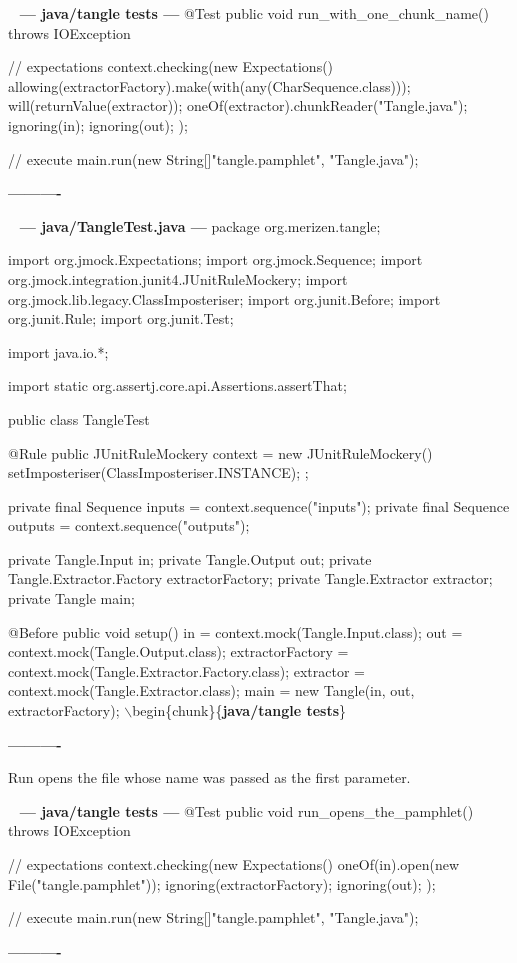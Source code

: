 \documentclass{book}
\newenvironment{chunk}[1]{%
{\ }\newline\noindent%
\hbox{\hskip 2.0cm}{\bf --- #1 ---}%
\verbatim}%                               say exactly what we see
{\endverbatim%
\par{}%
\noindent{}%
\hbox{\hskip 2.0cm}{\bf ----------}%
\par%
\normalsize\noindent}%
\providecommand{\getchunk}[1]{%
\noindent%
{\small $\backslash{}$begin\{chunk\}\{{\bf #1}\}}%
\index{{#1}}}
\begin{document}
\begin{chunk}{java/tangle tests}
@Test
public void run_with_one_chunk_name() throws IOException {
    // expectations
    context.checking(new Expectations() {{
        allowing(extractorFactory).make(with(any(CharSequence.class)));
        will(returnValue(extractor));
        oneOf(extractor).chunkReader("Tangle.java");
        ignoring(in);
        ignoring(out);
    }});

    // execute
    main.run(new String[]{"tangle.pamphlet", "Tangle.java"});
}
\end{chunk}

\begin{chunk}{java/TangleTest.java}
package org.merizen.tangle;

import org.jmock.Expectations;
import org.jmock.Sequence;
import org.jmock.integration.junit4.JUnitRuleMockery;
import org.jmock.lib.legacy.ClassImposteriser;
import org.junit.Before;
import org.junit.Rule;
import org.junit.Test;

import java.io.*;

import static org.assertj.core.api.Assertions.assertThat;

public class TangleTest {
    @Rule
    public JUnitRuleMockery context = new JUnitRuleMockery() {{
        setImposteriser(ClassImposteriser.INSTANCE);
    }};

    private final Sequence inputs = context.sequence("inputs");
    private final Sequence outputs = context.sequence("outputs");

    private Tangle.Input in;
    private Tangle.Output out;
    private Tangle.Extractor.Factory extractorFactory;
    private Tangle.Extractor extractor;
    private Tangle main;

    @Before
    public void setup() {
        in = context.mock(Tangle.Input.class);
        out = context.mock(Tangle.Output.class);
        extractorFactory = context.mock(Tangle.Extractor.Factory.class);
        extractor = context.mock(Tangle.Extractor.class);
        main = new Tangle(in, out, extractorFactory);
    }
\getchunk{java/tangle tests}
}
\end{chunk}

Run opens the file whose name was passed as the first parameter.

\begin{chunk}{java/tangle tests}
@Test
public void run_opens_the_pamphlet() throws IOException {
    // expectations
    context.checking(new Expectations() {{
        oneOf(in).open(new File("tangle.pamphlet"));
        ignoring(extractorFactory);
        ignoring(out);
    }});

    // execute
    main.run(new String[]{"tangle.pamphlet", "Tangle.java"});
}
\end{chunk}
\end{document}
